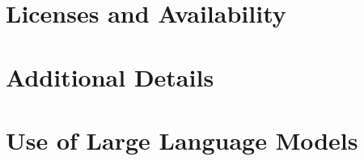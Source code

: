 \documentclass{article}
\newif\ifcameraready
\newcommand{\camerareadyonly}[1]{\ifcameraready #1\fi}
\begin{document}
\section*{Licenses and Availability}


\camerareadyonly{%
\section*{Author Contributions}

\section*{Acknowledgments}

}




\appendix
\section{Additional Details}\label{sec:appendix}


\section{Use of Large Language Models}\label{sec:llm}

\end{document}
